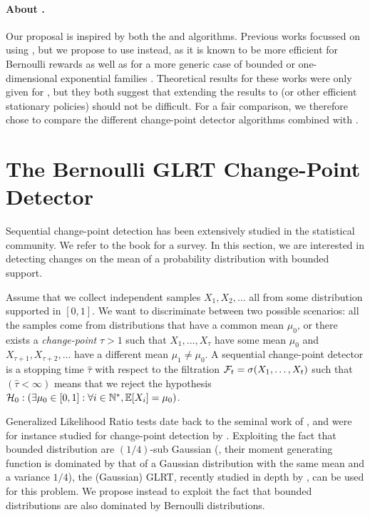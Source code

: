 \paragraph{About \klUCB.}
%
Our proposal \GLRklUCB{} is inspired by both the \MUCB{} and \CUSUMUCB{} algorithms.
Previous works focussed on using \UCB{} \cite{LiuLeeShroff17,CaoZhenKvetonXie18},
but we propose to use \klUCB{} instead, as it is known to be more efficient for Bernoulli rewards as well as for a more generic case of bounded or one-dimensional exponential families \cite{KLUCBJournal}.
Theoretical results for these works were only given for \UCB, but they both suggest that extending the results to \klUCB{} (or other efficient stationary policies) should not be difficult.
For a fair comparison, we therefore chose to compare the different change-point detector algorithms combined with \klUCB.


\section{The Bernoulli GLRT Change-Point Detector}
\label{sec:6:ChangePointDetector}

Sequential change-point detection has been extensively studied in the statistical community.
We refer to the book \cite{Basseville93} for a survey.
%
In this section, we are interested in detecting changes on the mean of a probability distribution with bounded support.

Assume that we collect independent samples $X_1,X_2,\ldots$ all from some distribution supported in $[0,1]$.
We want to discriminate between two possible scenarios: all the samples come from distributions that have a common mean $\mu_0$, or there exists a \emph{change-point} $\tau > 1$ such that $X_1,\ldots,X_\tau$ have some mean $\mu_0$ and $X_{\tau +1},X_{\tau+2},\ldots$ have a different mean $\mu_1 \neq \mu_0$.
%
A sequential change-point detector is a stopping time $\widehat{\tau}$ with respect to the filtration $\mathcal{F}_t = \sigma(X_1,\dots,X_t)$ such that $(\hat \tau < \infty)$ means that we reject the hypothesis
$\mathcal{H}_0 : \left(\exists \mu_0 \in [0,1]: \forall i\in\mathbb{N}^*, \mathbb{E}[X_i] = \mu_0\right)$.

Generalized Likelihood Ratio tests date back to the seminal work of \cite{Wilks1938}, and were for instance studied for change-point detection by \cite{barnard1959control,siegmund1995using}.
Exploiting the fact that bounded distribution are $(1/4)$-sub Gaussian (\ie, their moment generating function is dominated by that of a Gaussian distribution with the same mean and a variance $1/4$), the (Gaussian) GLRT, recently studied in depth by \cite{Maillard2018GLR}, can be used for this problem.
We propose instead to exploit the fact that bounded distributions are also dominated by Bernoulli distributions.

